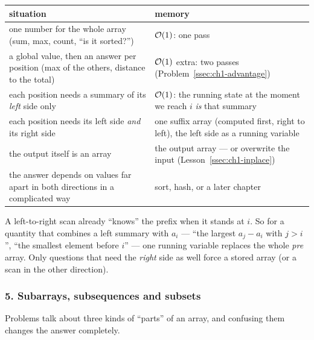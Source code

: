 \begin{table}[H]
\centering\small
\renewcommand{\arraystretch}{1.25}
\begin{tabularx}{\linewidth}{@{}>{\raggedright\arraybackslash}p{5.4cm} >{\raggedright\arraybackslash}X@{}}
\toprule
\textbf{situation} & \textbf{memory} \\
\midrule
one number for the whole array (sum, max, count, ``is it sorted?'') & $\mathcal{O}(1)$: one pass \\
a global value, then an answer per position (max of the others, distance to the total) & $\mathcal{O}(1)$ extra: two passes (Problem~\ref{ssec:ch1-advantage}) \\
each position needs a summary of its \emph{left} side only & $\mathcal{O}(1)$: the running state at the moment we reach $i$ \emph{is} that summary \\
each position needs its left side \emph{and} its right side & one suffix array (computed first, right to left), the left side as a running variable \\
the output itself is an array & the output array --- or overwrite the input (Lesson~\ref{ssec:ch1-inplace}) \\
the answer depends on values far apart in both directions in a complicated way & sort, hash, or a later chapter \\
\bottomrule
\end{tabularx}
\end{table}

\begin{insightbox}
A left-to-right scan already ``knows'' the prefix when it stands at $i$. So for a quantity that combines a left summary with $a_i$ --- ``the largest $a_j - a_i$ with $j > i$'', ``the smallest element before $i$'' --- one running variable replaces the whole \textit{pre} array. Only questions that need the \emph{right} side as well force a stored array (or a scan in the other direction).
\end{insightbox}

\subsubsection*{5. Subarrays, subsequences and subsets}

Problems talk about three kinds of ``parts'' of an array, and confusing them changes the answer completely.

